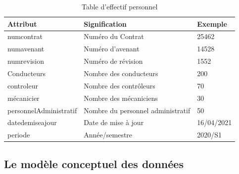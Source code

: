 \documentclass[a4paper]{report}
\begin{document}
\begin{doublespace}
	\begin{table}[H]
		\begin{center}
			\begin{tabularx}{17.5cm}{|p{4cm}|X|p{2cm}|}
				\hline
				\textbf{Attribut}      & \textbf{Signification}            & \textbf{Exemple} \\
				\hline
				numcontrat             & Numéro du Contrat                 & 25462            \\
				\hline
				numavenant             & Numéro d'avenant                  & 14528            \\
				\hline
				numrevision            & Numéro de révision                & 1552             \\
				\hline
				Conducteurs            & Nombre des conducteurs            & 200              \\
				\hline
				controleur             & Nombre des contrôleurs            & 70               \\
				\hline
				mécanicier             & Nombre des mécaniciens            & 30               \\
				\hline
				personnelAdministratif & Nombre du personnel administratif & 50               \\
				\hline
				datedemiseajour        & Date de mise à jour               & 16/04/2021       \\
				\hline
				periode                & Année/semestre                    & 2020/S1          \\
				\hline
			\end{tabularx}
			\caption{Table d'effectif personnel}
		\end{center}
	\end{table}

	\subsection{Le modèle conceptuel des données}


\end{doublespace}
\end{document}
